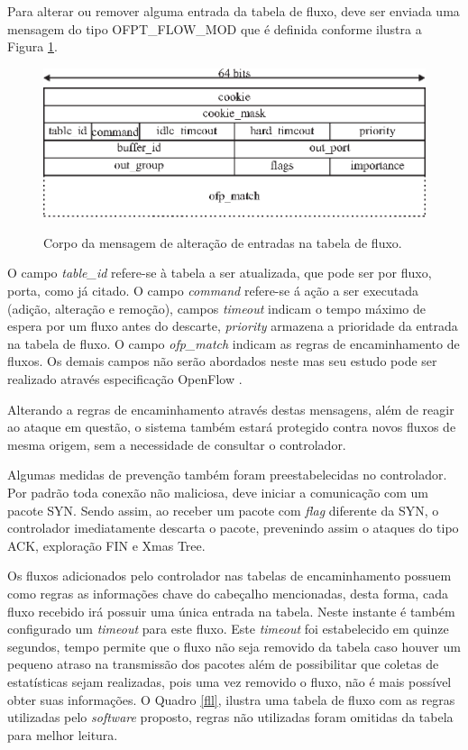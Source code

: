 Para alterar ou remover alguma entrada da tabela de fluxo, deve ser enviada uma mensagem do tipo OFPT\_FLOW\_MOD que é definida conforme ilustra a Figura \ref{fig:ofp-flow-mod}.

\begin{figure}[H]
  \centering
  \caption{Corpo da mensagem de alteração de entradas na tabela de fluxo.}
  \includegraphics[width=.80\textwidth]{images/ofp-flow-mod.eps}
  \label{fig:ofp-flow-mod}
\end{figure}
O campo \textit{table\_id} refere-se à tabela a ser atualizada, que pode ser por fluxo, porta, como já citado. O campo \textit{command} refere-se á ação a ser executada (adição, alteração e remoção), campos \textit{timeout} indicam o tempo máximo de espera por um fluxo antes do descarte, \textit{priority} armazena a prioridade da entrada na tabela de fluxo. O campo \textit{ofp\_match} indicam as regras de encaminhamento de fluxos. Os demais campos não serão abordados neste mas seu estudo pode ser realizado através especificação OpenFlow \cite{OpenFlowSpec:2014}.

Alterando a regras de encaminhamento através destas mensagens, além de reagir ao ataque em questão, o sistema também estará protegido contra novos fluxos de mesma origem, sem a necessidade de consultar o controlador.

Algumas medidas de prevenção também foram preestabelecidas no controlador. Por padrão toda conexão não maliciosa, deve iniciar a comunicação com um pacote SYN. Sendo assim, ao receber um pacote com \textit{flag} diferente da SYN, o controlador imediatamente descarta o pacote, prevenindo assim o ataques do tipo ACK, exploração FIN e Xmas Tree.

Os fluxos adicionados pelo controlador nas tabelas de encaminhamento possuem como regras as informações chave do cabeçalho mencionadas, desta forma, cada fluxo recebido irá possuir uma única entrada na tabela. Neste instante é também configurado um \textit{timeout} para este fluxo. Este \textit{timeout} foi estabelecido em quinze segundos, tempo permite que o fluxo não seja removido da tabela caso houver um pequeno atraso na transmissão dos pacotes além de possibilitar que coletas de estatísticas sejam realizadas, pois uma vez removido o fluxo, não é mais possível obter suas informações. O Quadro \ref{fll}, ilustra uma tabela de fluxo com as regras utilizadas pelo \textit{software} proposto, regras não utilizadas foram omitidas da tabela para melhor leitura.

